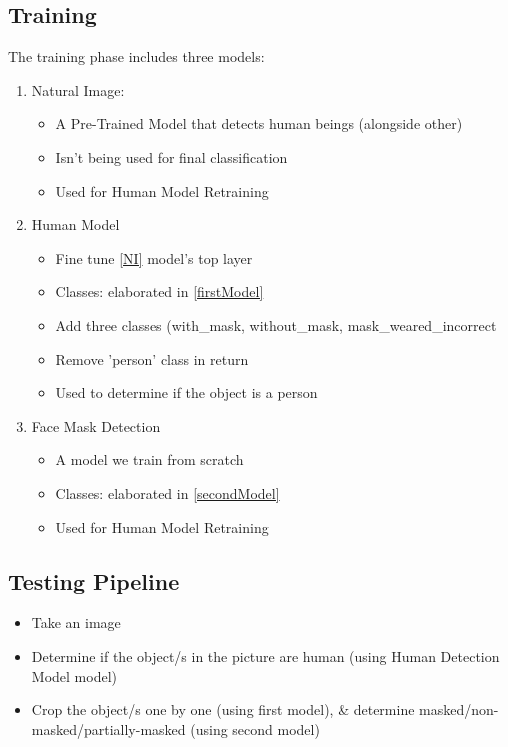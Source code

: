 \subsection{Training}
The training phase includes three models:
\begin{enumerate}
    \item \label{NI} Natural Image:
    \begin{itemize}
        \item A Pre-Trained Model that detects human beings (alongside other)
        \item Isn't being used for final classification
        \item Used for Human Model Retraining
    \end{itemize}
    \item Human Model
    \begin{itemize}
        \item Fine tune \ref{NI} model's top layer
        \item Classes: elaborated in \ref{firstModel}
        \item Add three classes (with\_mask, without\_mask, mask\_weared\_incorrect
        \item Remove 'person' class in return
        \item Used to determine if the object is a person
    \end{itemize}
    \item Face Mask Detection
    \begin{itemize}
        \item A model we train from scratch
        \item Classes: elaborated in \ref{secondModel}
        \item Used for Human Model Retraining
    \end{itemize}
\end{enumerate}


\subsection{Testing Pipeline}
\begin{itemize}
    \item Take an image
    \item Determine if the object/s in the picture are human (using Human Detection Model model)
    \item Crop the object/s one by one (using first model), \& determine masked/non-masked/partially-masked (using second model)
\end{itemize}
